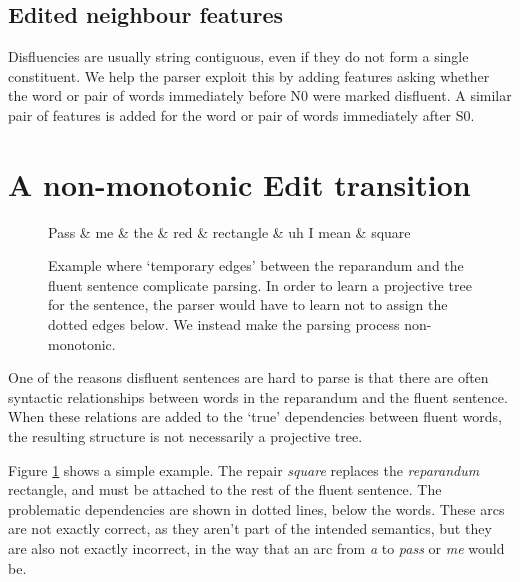 \documentclass[11pt,letterpaper]{article}
\newcommand{\szero}{S0\xspace}
\newcommand{\nzero}{N0\xspace}
\begin{document}
\subsection{Edited neighbour features}

Disfluencies are usually
string contiguous, even if they do not form a single constituent.  We help the
parser exploit this by adding features asking whether the word or pair of words
immediately before \nzero were marked disfluent. A similar pair of features is
added for the word or pair of words immediately after \szero.

\section{A non-monotonic Edit transition}
\label{sec:edittrans}
\begin{figure}
    \small
\begin{dependency}[theme=simple, segmented edge]
    \begin{deptext}[column sep=.075cm, row sep=.1ex]
    Pass \& me \& the \& red \& rectangle \& uh I mean \& square \\
    \end{deptext}
    \end{dependency}
    \caption{\small Example where `temporary edges' between the reparandum and the
    fluent sentence complicate parsing. In order to learn a projective tree
    for the sentence, the parser would have to learn not to assign the dotted
    edges below. We instead make the parsing process non-monotonic.
\label{fig:rectangle}}
\end{figure}

One of the reasons disfluent sentences are hard to parse is that there are often
syntactic relationships between words in the reparandum and the fluent sentence.
When these relations are added to the `true' dependencies between fluent words,
the resulting structure is not necessarily a projective tree.

Figure \ref{fig:rectangle} shows a simple example.
The repair \emph{square} replaces the \emph{reparandum} rectangle, and must be
attached to the rest of the fluent sentence.
The problematic dependencies are shown in dotted lines, below the words.
These arcs are not exactly correct, as they aren't part of the intended semantics,
but they are also not exactly incorrect, in the way that an arc from \emph{a}
to \emph{pass} or \emph{me} would be.
\end{document}
